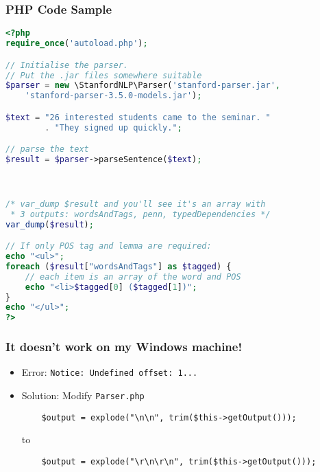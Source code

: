 \begin{frame}
\frametitle{PHP Code Sample}

\begin{lstlisting}[language=PHP,basicstyle={\ttfamily\small},
morekeywords={new}]
<?php
require_once('autoload.php');

// Initialise the parser. 
// Put the .jar files somewhere suitable
$parser = new \StanfordNLP\Parser('stanford-parser.jar', 
    'stanford-parser-3.5.0-models.jar');

$text = "26 interested students came to the seminar. " 
        . "They signed up quickly.";

// parse the text
$result = $parser->parseSentence($text);



/* var_dump $result and you'll see it's an array with 
 * 3 outputs: wordsAndTags, penn, typedDependencies */
var_dump($result);

// If only POS tag and lemma are required:
echo "<ul>";
foreach ($result["wordsAndTags"] as $tagged) {
    // each item is an array of the word and POS
    echo "<li>$tagged[0] ($tagged[1])";
}
echo "</ul>";
?>
\end{lstlisting}

\end{frame}


\begin{frame}[fragile]
\frametitle{It doesn't work on my Windows machine!}
    
\lstset{language=PHP,frame=single,basicstyle=\ttfamily\small,gobble=4}

\begin{itemize}
    \item Error: \texttt{Notice: Undefined offset: 1...}
    \item Solution: Modify \texttt{Parser.php}

    \begin{lstlisting}
    $output = explode("\n\n", trim($this->getOutput()));
    \end{lstlisting}

    to

    \begin{lstlisting}
    $output = explode("\r\n\r\n", trim($this->getOutput()));
    \end{lstlisting}

\end{itemize}

\end{frame}


